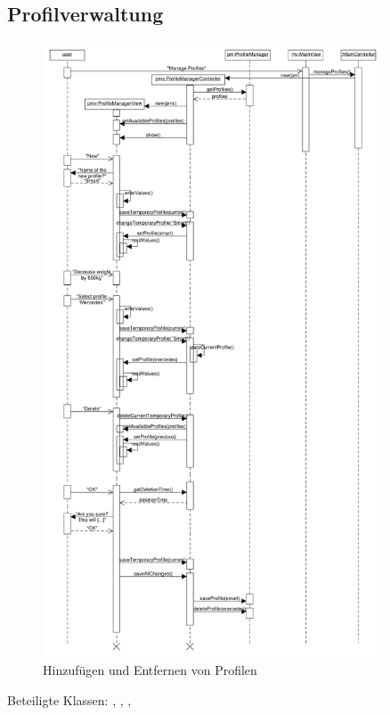 \documentclass[a4paper, 11pt]{article}
\begin{document}
\subsection{Profilverwaltung}
\begin{figure}[H]
\centering
\includegraphics[width=0.9\textwidth]{ProfilSequenz}
\caption{Hinzufügen und Entfernen von Profilen}
\label{fig:sequenz_profilVerwaltung}
\end{figure}
Beteiligte Klassen: , , , 
\end{document}
